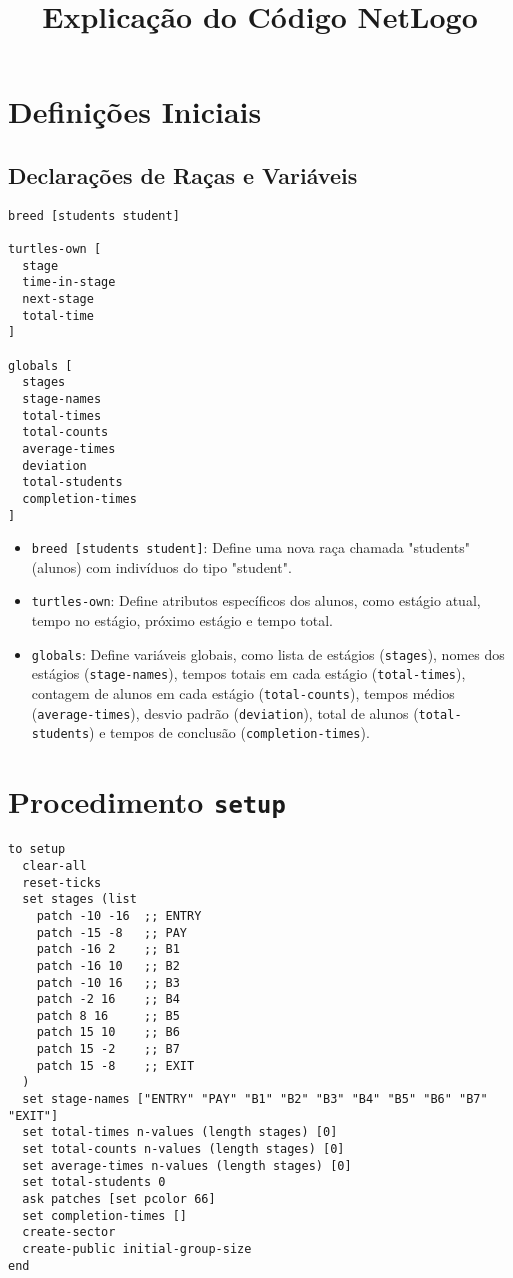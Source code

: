 \documentclass{article}
\begin{document}
\title{Explicação do Código NetLogo}
\author{}
\date{}
\maketitle

\section{Definições Iniciais}

\subsection{Declarações de Raças e Variáveis}

\begin{lstlisting}[language=NetLogo]
breed [students student]

turtles-own [
  stage
  time-in-stage
  next-stage
  total-time
]

globals [
  stages
  stage-names
  total-times
  total-counts
  average-times
  deviation
  total-students
  completion-times
]
\end{lstlisting}

\begin{itemize}
    \item \texttt{breed [students student]}: Define uma nova raça chamada "students" (alunos) com indivíduos do tipo "student".
    \item \texttt{turtles-own}: Define atributos específicos dos alunos, como estágio atual, tempo no estágio, próximo estágio e tempo total.
    \item \texttt{globals}: Define variáveis globais, como lista de estágios (\texttt{stages}), nomes dos estágios (\texttt{stage-names}), tempos totais em cada estágio (\texttt{total-times}), contagem de alunos em cada estágio (\texttt{total-counts}), tempos médios (\texttt{average-times}), desvio padrão (\texttt{deviation}), total de alunos (\texttt{total-students}) e tempos de conclusão (\texttt{completion-times}).
\end{itemize}

\section{Procedimento \texttt{setup}}

\begin{lstlisting}[language=NetLogo]
to setup
  clear-all
  reset-ticks
  set stages (list
    patch -10 -16  ;; ENTRY
    patch -15 -8   ;; PAY
    patch -16 2    ;; B1
    patch -16 10   ;; B2
    patch -10 16   ;; B3
    patch -2 16    ;; B4
    patch 8 16     ;; B5
    patch 15 10    ;; B6
    patch 15 -2    ;; B7
    patch 15 -8    ;; EXIT
  )
  set stage-names ["ENTRY" "PAY" "B1" "B2" "B3" "B4" "B5" "B6" "B7" "EXIT"]
  set total-times n-values (length stages) [0]
  set total-counts n-values (length stages) [0]
  set average-times n-values (length stages) [0]
  set total-students 0
  ask patches [set pcolor 66]
  set completion-times []
  create-sector
  create-public initial-group-size
end
\end{lstlisting}
\end{document}
